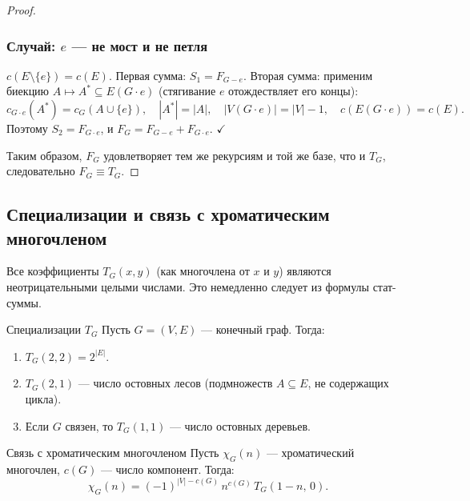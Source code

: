 \begin{proof}
  \subsubsection*{Случай: $e$ --- не мост и не петля}

  $c(E\setminus\{e\})=c(E)$.
  Первая сумма: $S_1=F_{G-e}$.
  Вторая сумма: применим биекцию $A\mapsto A^*\subseteq E(G\cdot e)$
  (стягивание $e$ отождествляет его концы):
  \[
    c_{G\cdot e}(A^*) = c_G(A\cup\{e\}),\quad
    |A^*| = |A|,\quad
    |V(G\cdot e)| = |V|-1,\quad
    c(E(G\cdot e)) = c(E).
  \]
  Поэтому $S_2 = F_{G\cdot e}$, и $F_G = F_{G-e}+F_{G\cdot e}$. $\checkmark$

  \medskip\noindent
  Таким образом, $F_G$ удовлетворяет тем же рекурсиям и той же базе,
  что и $T_G$, следовательно $F_G \equiv T_G$.
\end{proof}

\subsection{Специализации и связь с хроматическим многочленом}

\begin{Remark}{}{}
  Все коэффициенты $T_G(x,y)$ (как многочлена от $x$ и $y$)
  являются неотрицательными целыми числами.
  Это немедленно следует из формулы стат-суммы.
\end{Remark}

\begin{Statement}{Специализации $T_G$}{}
  Пусть $G=(V,E)$ --- конечный граф. Тогда:
  \begin{enumerate}
    \item $T_G(2,2)=2^{|E|}$.
    \item $T_G(2,1)$ --- число остовных лесов
          (подмножеств $A\subseteq E$, не содержащих цикла).
    \item Если $G$ связен, то $T_G(1,1)$ --- число остовных деревьев.
  \end{enumerate}
\end{Statement}

\begin{Theorem}{Связь с хроматическим многочленом}{}
  Пусть $\chi_G(n)$ --- хроматический многочлен, $c(G)$ --- число компонент. Тогда:
  \[
    \chi_G(n) = (-1)^{|V|-c(G)}\,n^{c(G)}\,T_G(1-n,\,0).
  \]
\end{Theorem}

